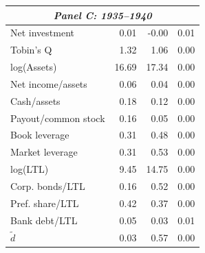 \begin{threeparttable}
\begin{tabular}{lrrr}
\midrule
\multicolumn{4}{c}{\textit{Panel C: 1935--1940}} \\
\midrule
Net investment & 0.01 & -0.00 & 0.01 \\
Tobin's Q & 1.32 & 1.06 & 0.00 \\
log(Assets) & 16.69 & 17.34 & 0.00 \\
Net income/assets & 0.06 & 0.04 & 0.00 \\
Cash/assets & 0.18 & 0.12 & 0.00 \\
Payout/common stock & 0.16 & 0.05 & 0.00 \\
Book leverage & 0.31 & 0.48 & 0.00 \\
Market leverage & 0.31 & 0.53 & 0.00 \\
log(LTL) & 9.45 & 14.75 & 0.00 \\
Corp. bonds/LTL & 0.16 & 0.52 & 0.00 \\
Pref. share/LTL & 0.42 & 0.37 & 0.00 \\
Bank debt/LTL & 0.05 & 0.03 & 0.01 \\
\ensuremath{\tilde{d}} & 0.03 & 0.57 & 0.00 \\
\bottomrule\end{tabular}\end{threeparttable}
